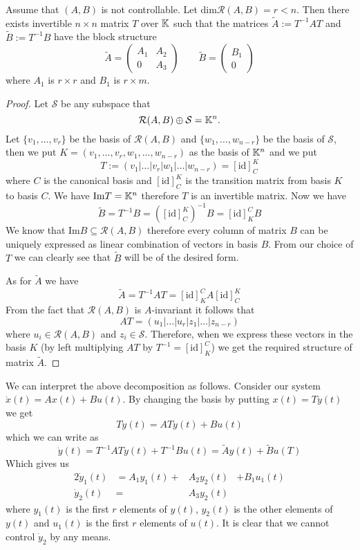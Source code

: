 \begin{theorem}
	\label{theorem:decomp}
	Assume that $(A,B)$ is not controllable. Let $\text{dim}\mathcal{R}(A,B)=r<n$. Then there exists invertible $n\times n$ matrix $T$ over $\mathbb{K}$ such that the matrices $\widetilde{A}:=T^{-1}AT$ and $\widetilde{B}:=T^{-1}B$ have the block structure 
	\begin{equation*}
		\widetilde{A}=
		\begin{pmatrix}
			A_1 & A_2 \\
			0   & A_3 
		\end{pmatrix}
		\qquad
		\widetilde{B}=
		\begin{pmatrix}
			B_1  \\
			0
		\end{pmatrix}
	\end{equation*}
	where $A_1$ is $r \times r$ and $B_1$ is $r \times m$.
\end{theorem}

\begin{proof}
	Let $\mathcal{S}$ be any subspace that $$\mathcal{R}(A,B)\oplus\mathcal{S}=\mathbb{K}^n.$$ Let $\{v_1,\ldots,v_r\}$ be the basis of $\mathcal{R}(A,B)$ and $\{w_1,\ldots,w_{n-r}\}$ be the basis of $\mathcal{S}$, then we put $K=(v_1,\ldots,v_r,w_1,\ldots,w_{n-r})$ as the basis of $\mathbb{K}^n$ and we put $$T:=(v_1|\ldots|v_r|w_1|\ldots|w_{n-r})=[\text{id}]^K_C$$ where $C$ is the canonical basis and $[\text{id}]^K_C$ is the transition matrix from basis $K$ to basis $C$. We have $\text{Im}T=\mathbb{K}^n$ therefore $T$ is an invertible matrix. Now we have $$\widetilde{B}=T^{-1}B=([\text{id}]^K_C)^{-1}B=[\text{id}]^C_KB$$ We know that $\text{Im}B\subseteq\mathcal{R}(A,B)$ therefore every column of matrix $B$ can be uniquely expressed as linear combination of vectors in basis $B$. From our choice of $T$ we can clearly see that $\widetilde{B}$ will be of the desired form.
	
	As for $\widetilde{A}$ we have $$\widetilde{A}=T^{-1}AT=[\text{id}]^C_KA[\text{id}]^K_C$$ From the fact that $\mathcal{R}(A,B)$ is $A$-invariant it follows that $$AT=(u_1|\ldots|u_r|z_1|\ldots|z_{n-r})$$ where $u_i \in \mathcal{R}(A,B)$ and $z_i \in \mathcal{S}$. Therefore, when we express these vectors in the basis $K$ (by left multiplying $AT$ by $T^{-1}=[\text{id}]^C_K$) we get the required structure of matrix $\widetilde{A}$.
\end{proof}

We can interpret the above decomposition as follows. Consider our system $\dot{x}(t)=Ax(t)+Bu(t)$. By changing the basis by putting $x(t)=Ty(t)$ we get $$T\dot{y}(t)=ATy(t)+Bu(t)$$ which we can write as $$\dot{y}(t)=T^{-1}ATy(t)+T^{-1}Bu(t)=\widetilde{A}y(t)+\widetilde{B}u(T)$$ Which gives us 
\begin{alignat*}{2}
	\dot{y}_1(t)&=A_1y_1(t)+&A_2y_2(t)&+B_1u_1(t) \\
	\dot{y}_2(t)&=&A_3y_2(t)&
\end{alignat*}
where $y_1(t)$ is the first $r$ elements of $y(t)$, $y_2(t)$ is the other elements of $y(t)$ and $u_1(t)$ is the first $r$ elements of $u(t)$. It is clear that we cannot control $\dot{y}_2$ by any means. 

